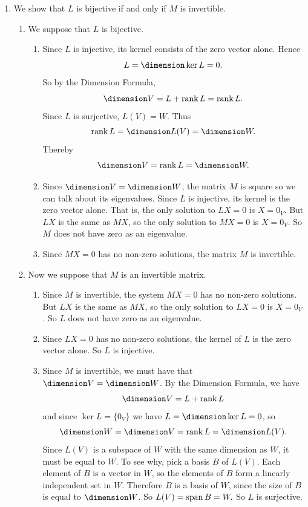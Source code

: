 \begin{enumerate}
\item  We  show  that  \(L\)  is  bijective  if  and  only  if  \(M\)  is  invertible.
 		\begin{enumerate}
 		\item  We  suppose  that  \(L\)  is  bijective.
 		\begin{enumerate}
 		\item  Since  \(L\)  is  injective,  its  kernel  consists  of  the  zero  vector  alone.  Hence
 		\[
 		\null  L=\dimension  \ker  L=0.
 		\]
 		So  by  the  Dimension  Formula,
 		\[
 		\dimension  V=\null  L+\rank  L=\rank  L.
 		\]
 		Since  \(L\)  is  surjective,  \(L(V)=W.\)  Thus
 		\[
 		\rank  L=\dimension  L(V)=\dimension  W.
 		\]
 		Thereby  \[\dimension  V=\rank  L=\dimension  W.\]
 		\item  Since  \(\dimension  V=\dimension  W\),  the  matrix  \(M\)  is  square  so  we  can  talk  about  its  eigenvalues.  Since  \(L\)  is  injective,  its  kernel  is  the  zero  vector  alone.  That  is,  the  only  solution  to  \(LX=0\)  is  \(X=0_V\).  But  \(LX\)  is  the  same  as  \(MX\),  so  the  only  solution  to  \(MX=0\)  is  \(X=0_V\).  So  \(M\)  does  not  have  zero  as  an  eigenvalue.
 		\item  Since  \(MX=0\)  has  no  non-zero  solutions,  the  matrix  \(M\)  is  invertible.
	\end{enumerate}
 		\item  Now  we  suppose  that  \(M\)  is  an  invertible  matrix.
 		\begin{enumerate}
 		\item  Since  \(M\)  is  invertible,  the  system  \(MX=0\)  has  no  non-zero  solutions.  But  \(LX\)  is  the  same  as  \(MX\),  so  the  only  solution  to  \(LX=0\)  is  \(X=0_V\).  So  \(L\)  does  not  have  zero  as  an  eigenvalue.
 		\item  Since  \(LX=0\)  has  no  non-zero  solutions,  the  kernel  of  \(L\)  is  the  zero  vector  alone.  So  \(L\)  is  injective.
 		\item  Since  \(M\)  is  invertible,  we  must  have  that  \(\dimension  V=\dimension  W\).  By  the  Dimension  Formula,  we  have
 		\[
 		\dimension  V=\null  L+\rank  L
 		\]
 		and  since  \(\ker  L=\{0_V\}\)  we  have  \(\null  L=\dimension  \ker  L=0\),  so
 		\[
 		\dimension  W=\dimension  V=\rank  L=\dimension  L(V).
 		\]
 		Since  \(L(V)\)  is  a  subspace  of  \(W\)  with  the  same  dimension  as  \(W\),  it  must  be  equal  to  \(W\).  To  see  why,  pick  a  basis  \(B\)  of  \(L(V)\).  Each  element  of  \(B\)  is  a  vector  in  \(W\),  so  the  elements  of  \(B\)  form  a  linearly  independent  set  in  \(W\).  Therefore  \(B\)  is  a  basis  of  \(W\),  since  the  size  of  \(B\)  is  equal  to  \(\dimension  W\).  So  \(L(V)=\operatorname{span}  B=W.\)  So  \(L\)  is  surjective.
 		\end{enumerate}
 		\end{enumerate}


\end{enumerate}
